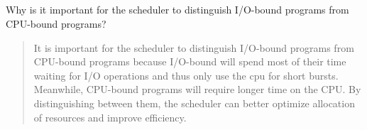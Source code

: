 \subsection*{} Why is it important for the scheduler to distinguish I/O-bound programs from CPU-bound
programs?
    \begin{quote}
        It is important for the scheduler to distinguish I/O-bound programs from CPU-bound programs because I/O-bound will spend most of their time waiting for I/O operations and thus only use the cpu for short bursts. Meanwhile, CPU-bound programs will require longer time on the CPU. By distinguishing between them, the scheduler can better optimize allocation of resources and improve efficiency.
    \end{quote}
    
    